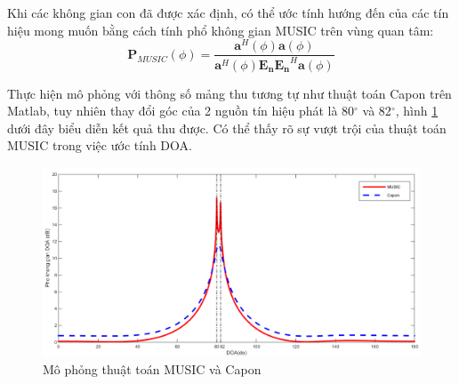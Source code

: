 Khi các không gian con đã được xác định, có thể ước tính hướng đến của các tín hiệu mong muốn bằng cách tính phổ không gian MUSIC trên vùng quan tâm:
\begin{equation}
	\mathbf{P}_{MUSIC}(\phi) = \frac{\mathbf{a}^{H}(\phi)\mathbf{a}(\phi)}{\mathbf{a}^{H}(\phi)\mathbf{E}_{\mathbf{n}}{\mathbf{E}_{\mathbf{n}}}^{H}\mathbf{a}({\phi})}
\end{equation}

Thực hiện mô phỏng với thông số mảng thu tương tự như thuật toán Capon trên Matlab, tuy nhiên thay đổi góc của 2 nguồn tín hiệu phát là 80$^{\circ}$ và 82$^{\circ}$, hình \ref{fig:MUSICvsCapon} dưới đây biểu diễn kết quả thu được. Có thể thấy rõ sự vượt trội của thuật toán MUSIC trong việc ước tính DOA.
\begin{figure} [!htb]
	\centering
	\includegraphics[width=1\linewidth]{figures/MUSICvsCapon.png}
	\caption{Mô phỏng thuật toán MUSIC và Capon}
	\label{fig:MUSICvsCapon}
\end{figure}